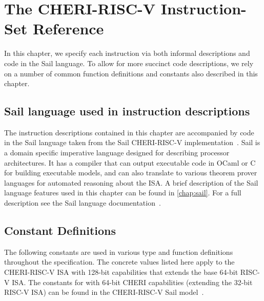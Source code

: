 \chapter{The CHERI-RISC-V Instruction-Set Reference}
\label{chap:isaref-riscv}


\def\rvcheriasminsnref#1{#1}
\def\rvcheriasminsnnoref#1{#1}
\providecommand{\rvcheriasmfmt}{}
\renewcommand{\rvcheriasmfmt}[2][]{%
  #2%
  \ifthenelse{\equal{#1}{}}{%
  }{%
    ~{\textit{\footnotesize{(#1)}}}%
  }%
}

In this chapter, we specify each instruction via both informal descriptions
and code in the Sail language.
To allow for more succinct code descriptions, we rely on a number of
common function definitions and constants also described in this chapter.

\section{Sail language used in instruction descriptions}
The instruction descriptions contained in this chapter are accompanied
by code in the Sail language taken from the Sail
CHERI-RISC-V implementation~\cite{sail-cheri-riscv}.
Sail is a domain specific imperative language designed for describing
processor architectures.  It has a compiler that can output executable
code in OCaml or C for building executable models, and can also
translate to various theorem prover languages for automated reasoning
about the ISA.
A brief description of the Sail language features used in this chapter can be
found in \cref{chap:sail}.
For a full description see the Sail language documentation~\cite{sail-url}.

\section{Constant Definitions}
The following constants are used in various type and function definitions throughout the specification.
The concrete values listed here apply to the CHERI-RISC-V ISA with
128-bit capabilities that extends the base 64-bit RISC-V ISA.
The constants for with 64-bit CHERI capabilities (extending the 32-bit RISC-V ISA)
can be found in the CHERI-RISC-V Sail model~\cite{sail-cheri-riscv}.

\medskip
\label{sailRISCVzxlen}
\sailRISCVtypecapAddrWidth{}
\sailRISCVtypecapLenWidth{}
\sailRISCVtypecapSizze{}
\sailRISCVtypecapMantissaWidth{}

